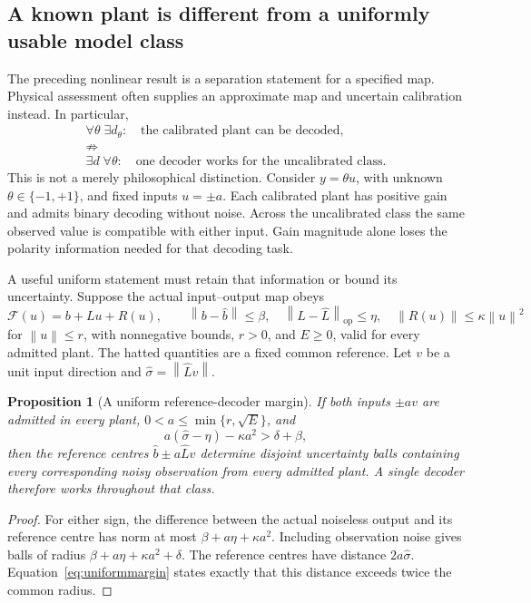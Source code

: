 \documentclass[11pt,a4paper]{article}
\newtheorem{proposition}[theorem]{Proposition}
\theoremstyle{definition}
\theoremstyle{remark}
\newcommand{\norm}[1]{\left\lVert#1\right\rVert}
\begin{document}
\subsection{A known plant is different from a uniformly usable model class}\label{sec:uncertain}
The preceding nonlinear result is a separation statement for a specified map. Physical assessment often supplies an approximate map and uncertain calibration instead. In particular,
\[
 \begin{gathered}
 \forall\theta\;\exists d_\theta:\quad
 \text{the calibrated plant can be decoded},\\
 \not\Rightarrow\\
 \exists d\;\forall\theta:\quad
 \text{one decoder works for the uncalibrated class}.
 \end{gathered}
\]
This is not a merely philosophical distinction. Consider $y=\theta u$, with unknown $\theta\in\{-1,+1\}$, and fixed inputs $u=\pm a$. Each calibrated plant has positive gain and admits binary decoding without noise. Across the uncalibrated class the same observed value is compatible with either input. Gain magnitude alone loses the polarity information needed for that decoding task.

A useful uniform statement must retain that information or bound its uncertainty. Suppose the actual input--output map obeys
\[
 \mathcal F(u)=b+Lu+R(u),\qquad
 \norm{b-\hat b}\leq\beta,\quad
 \norm{L-\hat L}_{\mathrm{op}}\leq\eta,\quad
 \norm{R(u)}\leq\kappa\norm{u}^{2}
\]
for $\norm{u}\leq r$, with nonnegative bounds, $r>0$, and $E\geq0$, valid for every admitted plant. The hatted quantities are a fixed common reference. Let $v$ be a unit input direction and $\hat\sigma=\norm{\hat L v}$.

\begin{proposition}[A uniform reference-decoder margin]\label{prop:uniform}
If both inputs $\pm av$ are admitted in every plant, $0<a\leq\min\{r,\sqrt E\}$, and
\begin{equation}\label{eq:uniformmargin}
 a(\hat\sigma-\eta)-\kappa a^2>\delta+\beta,
\end{equation}
then the reference centres $\hat b\pm a\hat L v$ determine disjoint uncertainty balls containing every corresponding noisy observation from every admitted plant. A single decoder therefore works throughout that class.
\end{proposition}
\begin{proof}
For either sign, the difference between the actual noiseless output and its reference centre has norm at most $\beta+a\eta+\kappa a^2$. Including observation noise gives balls of radius $\beta+a\eta+\kappa a^2+\delta$. The reference centres have distance $2a\hat\sigma$. Equation~\eqref{eq:uniformmargin} states exactly that this distance exceeds twice the common radius.
\end{proof}
\end{document}
